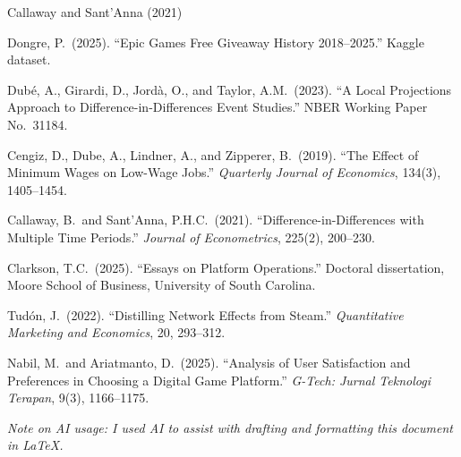 \documentclass[11pt]{article}
\begin{document}
\begin{thebibliography}{Callaway and Sant'Anna (2021)}
\setlength{\itemsep}{0.5em}

Dongre, P.\ (2025). ``Epic Games Free Giveaway History 2018--2025.'' Kaggle dataset.

Dub\'{e}, A., Girardi, D., Jord\`{a}, O., and Taylor, A.M.\ (2023). ``A Local Projections Approach to Difference-in-Differences Event Studies.'' NBER Working Paper No.\ 31184.

Cengiz, D., Dube, A., Lindner, A., and Zipperer, B.\ (2019). ``The Effect of Minimum Wages on Low-Wage Jobs.'' \textit{Quarterly Journal of Economics}, 134(3), 1405--1454.

Callaway, B.\ and Sant'Anna, P.H.C.\ (2021). ``Difference-in-Differences with Multiple Time Periods.'' \textit{Journal of Econometrics}, 225(2), 200--230.

Clarkson, T.C.\ (2025). ``Essays on Platform Operations.'' Doctoral dissertation, Moore School of Business, University of South Carolina.

Tud\'on, J.\ (2022). ``Distilling Network Effects from Steam.'' \textit{Quantitative Marketing and Economics}, 20, 293--312.

Nabil, M.\ and Ariatmanto, D.\ (2025). ``Analysis of User Satisfaction and Preferences in Choosing a Digital Game Platform.'' \textit{G-Tech: Jurnal Teknologi Terapan}, 9(3), 1166--1175.

\end{thebibliography}

\vspace{0.5em}
\noindent\textit{Note on AI usage: I used AI to assist with drafting and formatting this document in \LaTeX.}
\end{document}
